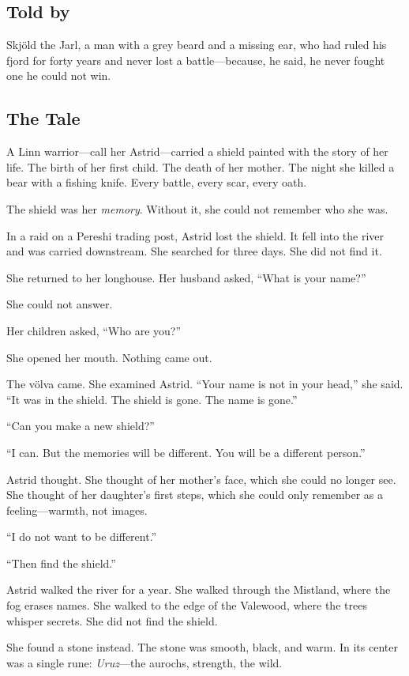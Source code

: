 \documentclass[9pt,a5paper]{extbook}
\begin{document}
\subsection*{Told by}

Skjöld the Jarl, a man with a grey beard and a missing ear, who had ruled his fjord for forty years and never lost a battle---because, he said, he never fought one he could not win.

\subsection*{The Tale}

A Linn warrior---call her Astrid---carried a shield painted with the story of her life. The birth of her first child. The death of her mother. The night she killed a bear with a fishing knife. Every battle, every scar, every oath.

The shield was her \textit{memory}. Without it, she could not remember who she was.

In a raid on a Pereshi trading post, Astrid lost the shield. It fell into the river and was carried downstream. She searched for three days. She did not find it.

She returned to her longhouse. Her husband asked, ``What is your name?''

She could not answer.

Her children asked, ``Who are you?''

She opened her mouth. Nothing came out.

The völva came. She examined Astrid. ``Your name is not in your head,'' she said. ``It was in the shield. The shield is gone. The name is gone.''

``Can you make a new shield?''

``I can. But the memories will be different. You will be a different person.''

Astrid thought. She thought of her mother's face, which she could no longer see. She thought of her daughter's first steps, which she could only remember as a feeling---warmth, not images.

``I do not want to be different.''

``Then find the shield.''

Astrid walked the river for a year. She walked through the Mistland, where the fog erases names. She walked to the edge of the Valewood, where the trees whisper secrets. She did not find the shield.

She found a stone instead. The stone was smooth, black, and warm. In its center was a single rune: \textit{Uruz}---the aurochs, strength, the wild.
\end{document}

